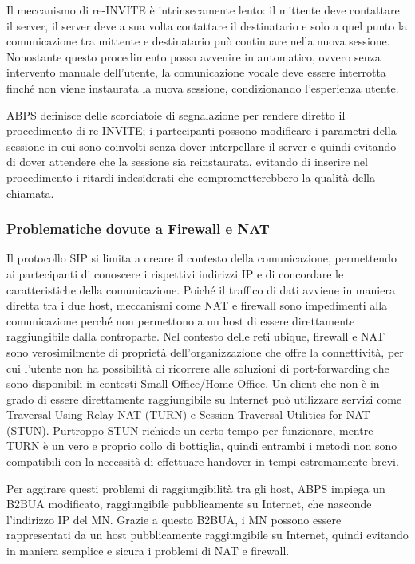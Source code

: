 \documentclass[12pt,a4paper,openright,twoside]{book}
\begin{document}
Il meccanismo di re-INVITE è intrinsecamente lento: il mittente deve
contattare il server, il server deve a sua volta contattare il
destinatario e solo a quel punto la comunicazione tra mittente e
destinatario può continuare nella nuova sessione. Nonostante questo
procedimento possa avvenire in automatico, ovvero senza intervento
manuale dell'utente, la comunicazione vocale deve essere interrotta
finché non viene instaurata la nuova sessione, condizionando
l'esperienza utente.

ABPS definisce delle scorciatoie di segnalazione per rendere diretto
il procedimento di re-INVITE; i partecipanti possono modificare i
parametri della sessione in cui sono coinvolti senza dover
interpellare il server e quindi evitando di dover attendere che la
sessione sia reinstaurata, evitando di inserire nel procedimento i
ritardi indesiderati che comprometterebbero la qualità della chiamata.

\subsubsection{Problematiche dovute a Firewall e NAT}

Il protocollo SIP si limita a creare il contesto della comunicazione,
permettendo ai partecipanti di conoscere i rispettivi indirizzi IP e
di concordare le caratteristiche della comunicazione. Poiché il
traffico di dati avviene in maniera diretta tra i due host, meccanismi
come NAT e firewall sono impedimenti alla comunicazione perché non
permettono a un host di essere direttamente raggiungibile dalla
controparte. Nel contesto delle reti ubique, firewall e NAT sono
verosimilmente di proprietà dell'organizzazione che offre la
connettività, per cui l'utente non ha possibilità di ricorrere alle
soluzioni di port-forwarding che sono disponibili in contesti Small
Office/Home Office. Un client che non è in grado di essere
direttamente raggiungibile su Internet può utilizzare servizi come
Traversal Using Relay NAT (TURN) e Session Traversal Utilities for NAT
(STUN). Purtroppo STUN richiede un certo tempo per funzionare, mentre
TURN è un vero e proprio collo di bottiglia, quindi entrambi i metodi
non sono compatibili con la necessità di effettuare handover in tempi
estremamente brevi.

Per aggirare questi problemi di raggiungibilità tra gli host, ABPS
impiega un B2BUA modificato, raggiungibile pubblicamente su Internet,
che nasconde l'indirizzo IP del MN. Grazie a questo B2BUA, i MN
possono essere rappresentati da un host pubblicamente raggiungibile su
Internet, quindi evitando in maniera semplice e sicura i problemi di
NAT e firewall.
\end{document}

